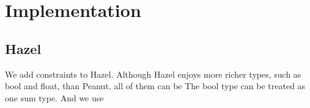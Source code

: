 \section{Implementation}
\subsection{Hazel}
We add constraints to Hazel. Although Hazel enjoys more richer types, such as bool and float, than Peanut, all of them can be  The bool type can be treated as one sum type. And we use 